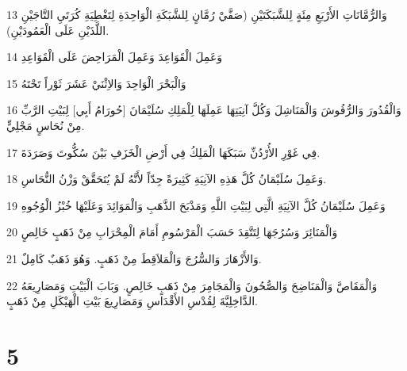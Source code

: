 \par 13 وَالرُّمَّانَاتِ الأَرْبَعِ مِئَةٍ لِلشَّبَكَتَيْنِ (صَفَّيْ رُمَّانٍ لِلشَّبَكَةِ الْوَاحِدَةِ لِتَغْطِيَةِ كُرَتَيِ التَّاجَيْنِ اللَّذَيْنِ عَلَى الْعَمُودَيْنِ).
\par 14 وَعَمِلَ الْقَوَاعِدَ وَعَمِلَ الْمَرَاحِضَ عَلَى الْقَوَاعِدِ
\par 15 وَالْبَحْرَ الْوَاحِدَ وَالاِثْنَيْ عَشَرَ ثَوْراً تَحْتَهُ
\par 16 وَالْقُدُورَ وَالرُّفُوشَ وَالْمَنَاشِلَ وَكُلَّ آنِيَتِهَا عَمِلَهَا لِلْمَلِكِ سُلَيْمَانَ [حُورَامُ أَبِي] لِبَيْتِ الرَّبِّ مِنْ نُحَاسٍ مَجْلِيٍّ.
\par 17 فِي غَوْرِ الأُرْدُنِّ سَبَكَهَا الْمَلِكُ فِي أَرْضِ الْخَزَفِ بَيْنَ سُكُّوتَ وَصَرَدَةَ.
\par 18 وَعَمِلَ سُلَيْمَانُ كُلَّ هَذِهِ الآنِيَةِ كَثِيرَةً جِدّاً لأَنَّهُ لَمْ يُتَحَقَّقْ وَزْنُ النُّحَاسِ.
\par 19 وَعَمِلَ سُلَيْمَانُ كُلَّ الآنِيَةِ الَّتِي لِبَيْتِ اللَّهِ وَمَذْبَحَ الذَّهَبِ وَالْمَوَائِدَ وَعَلَيْهَا خُبْزُ الْوُجُوهِ
\par 20 وَالْمَنَائِرَ وَسُرُجَهَا لِتَتَّقِدَ حَسَبَ الْمَرْسُومِ أَمَامَ الْمِحْرَابِ مِنْ ذَهَبٍ خَالِصٍ
\par 21 وَالأَزْهَارَ وَالسُّرُجَ وَالْمَلاَقِطَ مِنْ ذَهَبٍ. وَهُوَ ذَهَبٌ كَامِلٌ.
\par 22 وَالْمَقَاصَّ وَالْمَنَاضِحَ وَالصُّحُونَ وَالْمَجَامِرَ مِنْ ذَهَبٍ خَالِصٍ. وَبَابَ الْبَيْتِ وَمَصَارِيعَهُ الدَّاخِلِيَّةَ لِقُدْسِ الأَقْدَاسِ وَمَصَارِيعَ بَيْتِ الْهَيْكَلِ مِنْ ذَهَبٍ.

\chapter{5}

